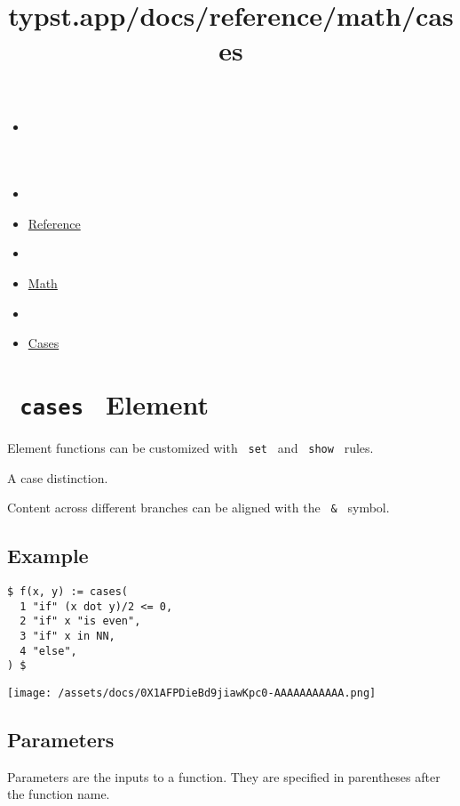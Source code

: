 \title{typst.app/docs/reference/math/cases}

\begin{itemize}
\tightlist
\item
  \href{/docs}{}
\item
  
\item
  \href{/docs/reference/}{Reference}
\item
  
\item
  \href{/docs/reference/math/}{Math}
\item
  
\item
  \href{/docs/reference/math/cases/}{Cases}
\end{itemize}

\section{\texorpdfstring{\texttt{\ cases\ } {{ Element
}}}{ cases   Element }}\label{summary}

\label{element-tooltip}
Element functions can be customized with \texttt{\ set\ } and
\texttt{\ show\ } rules.

A case distinction.

Content across different branches can be aligned with the
\texttt{\ \&\ } symbol.

\subsection{Example}\label{example}

\begin{verbatim}
$ f(x, y) := cases(
  1 "if" (x dot y)/2 <= 0,
  2 "if" x "is even",
  3 "if" x in NN,
  4 "else",
) $
\end{verbatim}

\texttt{[image: /assets/docs/0X1AFPDieBd9jiawKpc0-AAAAAAAAAAA.png]}

\subsection{\texorpdfstring{{ Parameters
}}{ Parameters }}\label{parameters}

\label{parameters-tooltip}
Parameters are the inputs to a function. They are specified in
parentheses after the function name.

